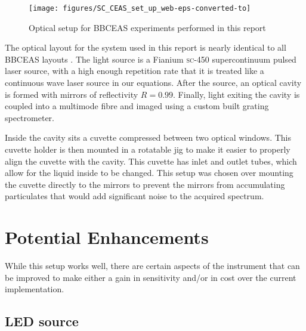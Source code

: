 \begin{figure}
\begin{center}
\texttt{[image: figures/SC\_CEAS\_set\_up\_web-eps-converted-to]}
\end{center}
\caption{Optical setup for \ac{BBCEAS} experiments performed in this report}
\label{fig:optical_layout}
\end{figure}

The optical layout for the system used in this report is nearly identical to
all \ac{BBCEAS} layouts \cite{Berden:2009wk}. The light source is a Fianium
\textsc{sc-450} supercontinuum pulsed laser source, with a high enough
repetition rate that it is treated like a continuous wave laser source in our
equations. After the source, an optical cavity is formed with mirrors of
reflectivity $R=0.99$. Finally, light exiting the cavity is coupled into a
multimode fibre and imaged using a custom built grating spectrometer.

Inside the cavity sits a cuvette compressed between two optical windows. This
cuvette holder is then mounted in a rotatable jig to make it easier to properly
align the cuvette with the cavity. This cuvette has inlet and outlet tubes,
which allow for the liquid inside to be changed. This setup was chosen over
mounting the cuvette directly to the mirrors \cite{Seetohul:2009ij} to prevent
the mirrors from accumulating particulates that would add significant noise to
the acquired spectrum.




\section{Potential Enhancements}\label{sec:bbceas_enhance}

While this setup works well, there are certain aspects of the instrument that
can be improved to make either a gain in sensitivity and/or in cost over the
current implementation.

\subsection{LED source}\label{sec:bbceas_led}

